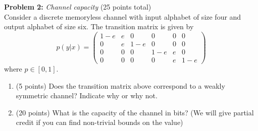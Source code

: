 \noindent \textbf{Problem 2:} \emph{Channel capacity} (25 points total)\\
Consider a discrete memoryless channel with input alphabet of size four and output alphabet of size six. The transition matrix is given by
\begin{equation*}
p(y|x)=\begin{pmatrix}
1-e & e & 0 & 0 &0&0\\
0 & e & 1-e & 0 &0&0\\
0 & 0 &0  & 1-e & e&0\\
0 & 0 &0  & 0 & e &1-e
\end{pmatrix}
\end{equation*}
where $p\in[0,1]$.
\begin{enumerate}
\item (5 points) Does the transition matrix above correspond to a weakly symmetric channel? Indicate why or why not.

\noindent{}
\item (20 points) What is the capacity of the channel in bits? (We will give partial credit if you can find non-trivial bounds on the value)

\noindent{}
\end{enumerate}
